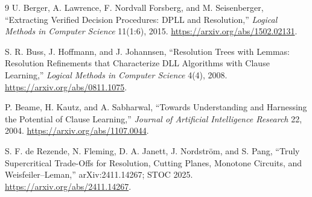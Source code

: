 \documentclass[11pt]{article}
\begin{document}
\begin{thebibliography}{9}
U. Berger, A. Lawrence, F. Nordvall Forsberg, and M. Seisenberger,
``Extracting Verified Decision Procedures: DPLL and Resolution,''
\emph{Logical Methods in Computer Science} 11(1:6), 2015.
\url{https://arxiv.org/abs/1502.02131}.

S. R. Buss, J. Hoffmann, and J. Johannsen,
``Resolution Trees with Lemmas: Resolution Refinements that Characterize DLL
Algorithms with Clause Learning,'' \emph{Logical Methods in Computer Science}
4(4), 2008.
\url{https://arxiv.org/abs/0811.1075}.

P. Beame, H. Kautz, and A. Sabharwal,
``Towards Understanding and Harnessing the Potential of Clause Learning,''
\emph{Journal of Artificial Intelligence Research} 22, 2004.
\url{https://arxiv.org/abs/1107.0044}.

S. F. de Rezende, N. Fleming, D. A. Janett, J. Nordstr\"om, and S. Pang,
``Truly Supercritical Trade-Offs for Resolution, Cutting Planes, Monotone
Circuits, and Weisfeiler--Leman,'' arXiv:2411.14267; STOC 2025.
\url{https://arxiv.org/abs/2411.14267}.
\end{thebibliography}
\end{document}
